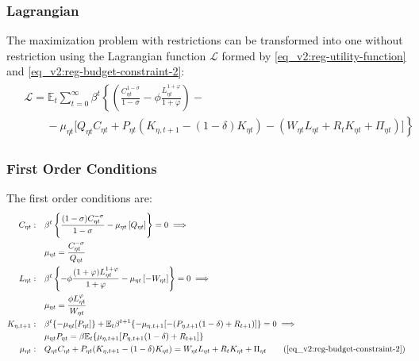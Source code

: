\documentclass[../thesis.tex]{subfiles}
\begin{document}
\subsubsection*{Lagrangian}

	The maximization problem with restrictions can be transformed into one without restriction using the Lagrangian function $\mathcal{L}$ formed by \ref{eq_v2:reg-utility-function} and \ref{eq_v2:reg-budget-constraint-2}:
	\begin{align}
		\begin{split}
		& \mathcal{L} = \mathbb{E}_t \sum_{t=0}^{\infty} \beta^t \left\{ \left( \frac{C_{\eta t}^{1 -\sigma}}{1 -\sigma} - \phi \frac{L_{\eta t}^{1+\varphi}}{1+\varphi} \right) \right. - 
		\\ & \qquad - \left. \mu_{\eta t} \Big[ Q_{\eta t} C_{\eta t} + P_{\eta t} (K_{\eta,t+1} - (1 - \delta) K_{\eta t}) - (W_{\eta t} L_{\eta t} + R_{t} K_{\eta t} + \Pi_{\eta t}) \Big] \right\} \label{eq_v2:reg-household-lagrangian}
		\end{split}
	\end{align}

\subsubsection*{First Order Conditions}

The first order conditions are:
\begin{align}
	C_{\eta t}: &\quad \beta^t \left\{ \frac{(1 -\sigma) C_{\eta t}^{-\sigma}}{1-\sigma} - \mu_{\eta t} \left[ Q_{\eta t} \right] \right\} = 0 \implies \nonumber \\
	&\quad \mu_{\eta t} = \frac{C_{\eta t}^{-\sigma}}{Q_{\eta t}} \label{eq_v2:reg-FOC-C-eta-t}
	\\
	L_{\eta t}: &\quad \beta^t \left\{ -\phi \frac{(1+\varphi) L_{\eta t}^{1 + \varphi}}{1 + \varphi} - \mu_{\eta t} \left[ -W_{\eta t} \right] \right\} = 0 \implies \nonumber \\
	&\quad \mu_{\eta t} = \frac{\phi L_{\eta t}^{\varphi}}{W_{\eta t}} \label{eq_v2:reg-FOC-Lt}
	\\
	K_{\eta,t+1}: &\quad \beta^t \{-\mu_{\eta t} [P_{\eta t}] \} + \mathbb{E}_{t} \beta^{t+1} \{ -\mu_{\eta,t+1} [-(P_{\eta,t+1} (1 - \delta) + R_{t+1})] \} = 0 \implies \nonumber \\
	&\quad \mu_{\eta t} P_{\eta t} = \beta \mathbb{E}_{t} \{ \mu_{\eta,t+1} [P_{\eta,t+1} (1 - \delta) + R_{t+1}] \} \label{eq_v2:reg-FOC-Kt}
	\\
	\mu_{\eta t}: &\quad Q_{\eta t} C_{\eta t} + P_{\eta t} (K_{\eta,t+1} - (1 - \delta) K_{\eta t}) = W_{\eta t} L_{\eta t} + R_{t} K_{\eta t} + \Pi_{\eta t} \tag{\ref{eq_v2:reg-budget-constraint-2}}
\end{align}
\end{document}
